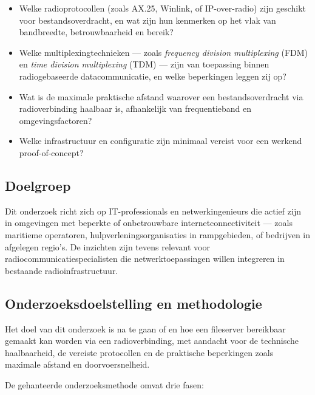 \begin{itemize}
  \item Welke radioprotocollen (zoals AX.25, Winlink, of IP-over-radio) zijn geschikt voor bestandsoverdracht, en wat zijn hun kenmerken op het vlak van bandbreedte, betrouwbaarheid en bereik?
  \item Welke multiplexingtechnieken — zoals \textit{frequency division multiplexing} (FDM) en \textit{time division multiplexing} (TDM) — zijn van toepassing binnen radiogebaseerde datacommunicatie, en welke beperkingen leggen zij op?
  \item Wat is de maximale praktische afstand waarover een bestandsoverdracht via radioverbinding haalbaar is, afhankelijk van frequentieband en omgevingsfactoren?
  \item Welke infrastructuur en configuratie zijn minimaal vereist voor een werkend proof-of-concept?
\end{itemize}

\subsection*{Doelgroep}

Dit onderzoek richt zich op IT-professionals en netwerkingenieurs die actief zijn in omgevingen met beperkte of onbetrouwbare internetconnectiviteit — zoals maritieme operatoren, hulpverleningsorganisaties in rampgebieden, of bedrijven in afgelegen regio's. De inzichten zijn tevens relevant voor radiocommunicatiespecialisten die netwerktoepassingen willen integreren in bestaande radioinfrastructuur.

\subsection*{Onderzoeksdoelstelling en methodologie}

Het doel van dit onderzoek is na te gaan of en hoe een fileserver bereikbaar gemaakt kan worden via een radioverbinding, met aandacht voor de technische haalbaarheid, de vereiste protocollen en de praktische beperkingen zoals maximale afstand en doorvoersnelheid.

De gehanteerde onderzoeksmethode omvat drie fasen:


